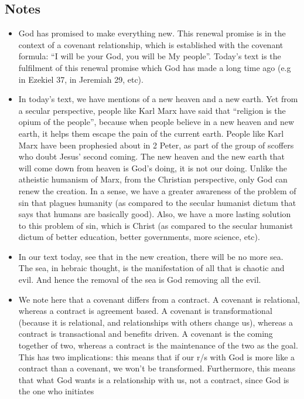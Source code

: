 \subsection*{Notes}
\begin{itemize}
  \item{God has promised to make everything new. This renewal promise is in
  the context of a covenant relationship, which is established with the
  covenant formula: ``I will be your God, you will be My people''. Today's
  text is the fulfilment of this renewal promise which God has made a long
  time ago (e.g in Ezekiel 37, in Jeremiah 29, etc).}
  \item{In today's text, we have mentions of a new heaven and a new earth.
  Yet from a secular perspective, people like Karl Marx have said that
  ``religion is the opium of the people'', because when people believe in a
  new heaven and new earth, it helps them escape the pain of the current
  earth. People like Karl Marx have been prophesied about in 2 Peter, as part
  of the group of scoffers who doubt Jesus' second coming. The new heaven and
  the new earth that will come down from heaven is God's doing, it is not our
  doing. Unlike the atheistic humanism of Marx, from the Christian
  perspective, only God can renew the creation. In a sense, we have a greater
  awareness of the problem of sin that plagues humanity (as compared to the
  secular humanist dictum that says that humans are basically good). Also, we
  have a more lasting solution to this problem of sin, which is Christ (as
  compared to the secular humanist dictum of better education, better
  governments, more science, etc).}
  \item{In our text today, see that in the new creation, there will be no
  more sea. The sea, in hebraic thought, is the manifestation of all that is
  chaotic and evil. And hence the removal of the sea is God removing all the evil.}
  \item{We note here that a covenant differs from a contract. A covenant is
  relational, whereas a contract is agreement based. A covenant is
  transformational (because it is relational, and relationships with others
  change us), whereas a contract is transactional and benefits driven. A
  covenant is the coming together of two, whereas a contract is the
  maintenance of the two as the goal. This has two implications: this means
  that if our r/s with God is more like a contract than a covenant, we won't
  be transformed. Furthermore, this means that what God wants is a
  relationship with us, not a contract, since God is the one who initiates
}
\end{itemize}
